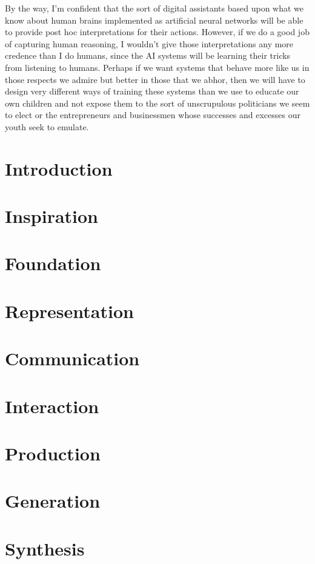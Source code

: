 By the way, I'm confident that the sort of digital assistants based upon what we know about human brains implemented as artificial neural networks will be able to provide post hoc interpretations for their actions. However, if we do a good job of capturing human reasoning, I wouldn't give those interpretations any more credence than I do humans, since the AI systems will be learning their tricks from listening to humans. Perhaps if we want systems that behave more like us in those respects we admire but better in those that we abhor, then we will have to design very different ways of training these systems than we use to educate our own children and not expose them to the sort of unscrupulous politicians we seem to elect or the entrepreneurs and businessmen whose successes and excesses our youth seek to emulate.


\section{Introduction}
\section{Inspiration}
\section{Foundation}
\section{Representation}
\section{Communication}
\section{Interaction}
\section{Production}
\section{Generation}
\section{Synthesis}


